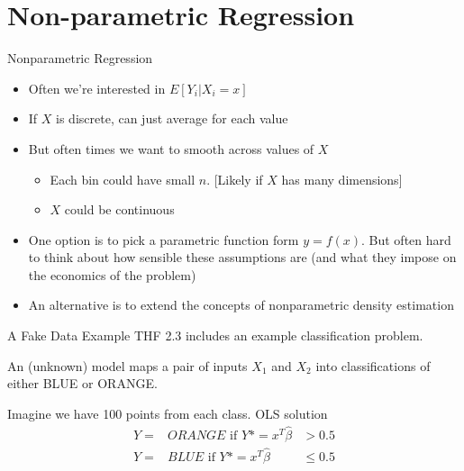 \section{Non-parametric Regression}

\begin{frame}{Nonparametric Regression}
  \begin{itemize}
  \item Often we're interested in $E\left[Y_i | X_i = x \right]$ 
  \item If $X$ is discrete, can just average for each value
  \item But often times we want to smooth across values of $X$
  \begin{itemize}
    \item Each bin could have small $n$. [Likely if $X$ has many dimensions]
    \item $X$ could be continuous  
  \end{itemize}
  \item One option is to pick a parametric function form $y=f(x)$. But often hard to think about how sensible these assumptions are (and what they impose on the economics of the problem)
  \item An alternative is to extend the concepts of nonparametric density estimation
  \end{itemize}
\end{frame}

\begin{frame}{A Fake Data Example}
THF 2.3 includes an example classification problem. 

An (unknown) model maps a pair of inputs $X_1$ and $X_2$ into classifications of either BLUE or ORANGE. 



Imagine we have 100 points from each class. OLS solution 
\begin{eqnarray*}
Y=&ORANGE \mbox{ if } Y* = x^T\hat \beta &> 0.5 \\
Y=&BLUE  \mbox{ if }   Y* =  x^T\hat \beta &\leq 0.5
\end{eqnarray*}
\end{frame}

